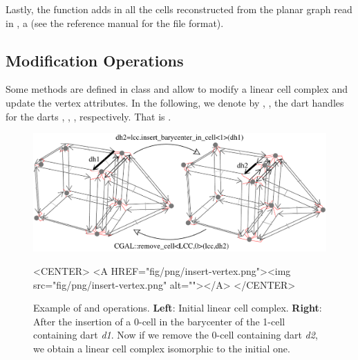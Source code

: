 Lastly, the function  adds in
 all the cells reconstructed from the planar graph read in
, a  (see the reference manual for the file
format).

\subsection{Modification Operations}\label{ssec-modif-op}

Some methods are defined in  class and allow
to modify a linear cell complex and update the vertex attributes.  In
the following, we denote by , ,  the dart
handles for the darts , , , respectively. That
is .


\begin{figure}[htb]
  \begin{ccTexOnly}
    \begin{center}
      \includegraphics[width=.75\textwidth]{Linear_cell_complex/fig/pdf/insert-vertex}
    \end{center}
  \end{ccTexOnly}
  \begin{ccHtmlOnly}
    <CENTER> <A HREF="fig/png/insert-vertex.png"><img
    src="fig/png/insert-vertex.png" alt=""></A> </CENTER>
  \end{ccHtmlOnly}
  \caption{Example of  and
     operations. \textbf{Left}: Initial linear
    cell complex.  \textbf{Right}: After the insertion of a 0-cell in
    the barycenter of the 1-cell containing dart \emph{d1}.  Now if we
    remove the 0-cell containing dart \emph{d2}, we obtain a linear
    cell complex isomorphic to the initial one.}
  \label{fig-lcc-insert-vertex}
\end{figure}

